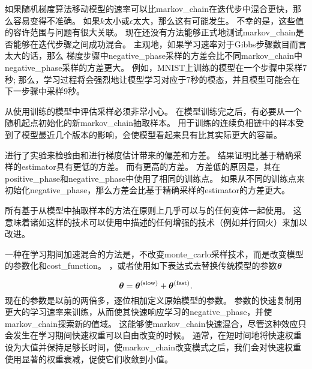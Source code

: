 如果随机梯度算法移动模型的速率可以比\gls{markov_chain}在迭代步中混合更快，那么容易变得不准确。
如果$k$太小或$\epsilon$太大，那么这有可能发生。
不幸的是，这些值的容许范围与问题有很大关联。
现在还没有方法能够正式地测试\gls{markov_chain}是否能够在迭代步骤之间成功混合。
主观地，如果学习速率对于Gibbs步骤数目而言太大的话，那么
梯度步骤中\gls{negative_phase}采样的方差会比不同\gls{markov_chain}中\gls{negative_phase}采样的方差更大。
例如，MNIST上训练的模型在一个步骤中采样$7$秒;
那么，学习过程将会强烈地让模型学习对应于$7$秒的模态，并且模型可能会在下一步骤中采样$9$秒。


从使用训练的模型中评估采样必须非常小心。
在模型训练完之后，有必要从一个随机起点初始化的新\gls{markov_chain}抽取样本。
用于训练的连续负相链中的样本受到了模型最近几个版本的影响，会使模型看起来具有比其实际更大的容量。



\cite{BerglundR13}进行了实验来检验由和进行梯度估计带来的偏差和方差。
结果证明比基于精确采样的\gls{estimator}具有更低的方差。
而有更高的方差。
方差低的原因是，其在\gls{positive_phase}和\gls{negative_phase}中使用了相同的训练点。
如果从不同的训练点来初始化\gls{negative_phase}，那么方差会比基于精确采样的\gls{estimator}的方差更大。


所有基于从模型中抽取样本的方法在原则上几乎可以与的任何变体一起使用。
这意味着诸如这样的技术可以使用中描述的任何增强的技术（例如并行回火）来加以改进\citep{desjardins2010tempered,Cho10IJCNN-small}。


一种在学习期间加速混合的方法是，不改变\gls{monte_carlo}采样技术，而是改变模型的参数化和\gls{cost_function}。
，或者\citep{TielemanT2009-small}使用如下表达式去替换传统模型的参数$\boldsymbol{\theta}$

\begin{equation}
	\boldsymbol{\theta} = \boldsymbol{\theta}^{\text{(slow)}} + \boldsymbol{\theta}^{\text{(fast)}}.
\end{equation}
现在的参数是以前的两倍多，逐位相加定义原始模型的参数。
参数的快速复制用更大的学习速率来训练，从而使其快速响应学习的\gls{negative_phase}，并使\gls{markov_chain}探索新的值域。
这能够使\gls{markov_chain}快速混合，尽管这种效应只会发生在学习期间快速权重可以自由改变的时候。
通常，在短时间地将快速权重设为大值并保持足够长时间，使\gls{markov_chain}改变模式之后，我们会对快速权重使用显著的权重衰减，促使它们收敛到小值。


